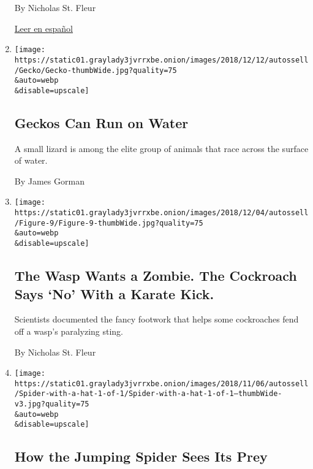 \begin{enumerate}
  By Nicholas St. Fleur

  \href{https://www.nytimes3xbfgragh.onion/es/2019/01/12/volcanes-explosiones-lava/}{Leer
  en español}
\item
  \href{/2018/12/11/science/geckos-running-water.html}{}

  \texttt{[image: https://static01.graylady3jvrrxbe.onion/images/2018/12/12/autossell/Gecko/Gecko-thumbWide.jpg?quality=75\\\&auto=webp\\\&disable=upscale]}

  \hypertarget{geckos-can-run-on-water}{%
  \subsection{Geckos Can Run on Water}\label{geckos-can-run-on-water}}

  A small lizard is among the elite group of animals that race across
  the surface of water.

  By James Gorman
\item
  \href{/2018/11/27/science/cockroach-kick-wasp.html}{}

  \texttt{[image: https://static01.graylady3jvrrxbe.onion/images/2018/12/04/autossell/Figure-9/Figure-9-thumbWide.jpg?quality=75\\\&auto=webp\\\&disable=upscale]}

  \hypertarget{the-wasp-wants-a-zombie-the-cockroach-says-no-with-a-karate-kick}{%
  \subsection{The Wasp Wants a Zombie. The Cockroach Says `No' With a
  Karate
  Kick.}\label{the-wasp-wants-a-zombie-the-cockroach-says-no-with-a-karate-kick}}

  Scientists documented the fancy footwork that helps some cockroaches
  fend off a wasp's paralyzing sting.

  By Nicholas St. Fleur
\item
  \href{/2018/11/06/science/spider-vision.html}{}

  \texttt{[image: https://static01.graylady3jvrrxbe.onion/images/2018/11/06/autossell/Spider-with-a-hat-1-of-1/Spider-with-a-hat-1-of-1--thumbWide-v3.jpg?quality=75\\\&auto=webp\\\&disable=upscale]}

  \hypertarget{how-the-jumping-spider-sees-its-prey}{%
  \subsection{How the Jumping Spider Sees Its
  Prey}\label{how-the-jumping-spider-sees-its-prey}}


\end{enumerate}
